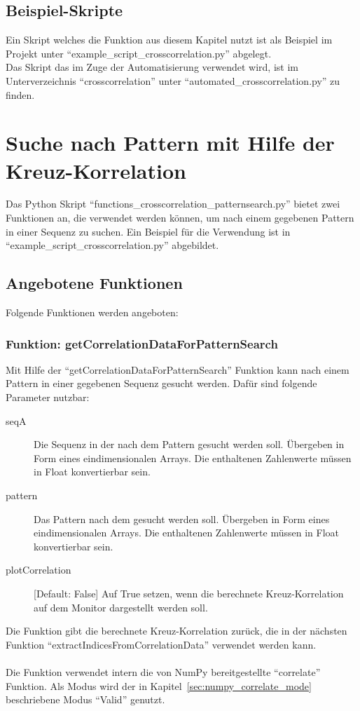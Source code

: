 \section{Beispiel-Skripte}
Ein Skript welches die Funktion aus diesem Kapitel nutzt ist als Beispiel im Projekt unter \enquote{example\_script\_crosscorrelation.py} abgelegt.\\
Das Skript das im Zuge der Automatisierung verwendet wird, ist im Unterverzeichnis \enquote{crosscorrelation} unter \enquote{automated\_crosscorrelation.py} zu finden.









\chapter{Suche nach Pattern mit Hilfe der Kreuz-Korrelation}
\label{chp:crosscorrelation:patternsearch}
Das Python Skript \enquote{functions\_crosscorrelation\_patternsearch.py} bietet zwei Funktionen an, die verwendet werden können, 
um nach einem gegebenen Pattern in einer Sequenz zu suchen.
Ein Beispiel für die Verwendung ist in \enquote{example\_script\_crosscorrelation.py} abgebildet.

\section{Angebotene Funktionen}
Folgende Funktionen werden angeboten:

\subsection{Funktion: getCorrelationDataForPatternSearch}
Mit Hilfe der \enquote{getCorrelationDataForPatternSearch} Funktion kann nach einem Pattern in einer gegebenen Sequenz gesucht werden. Dafür sind folgende Parameter nutzbar:
\begin{description}
    \item[seqA] Die Sequenz in der nach dem Pattern gesucht werden soll. Übergeben in Form eines eindimensionalen Arrays. Die enthaltenen Zahlenwerte müssen in Float konvertierbar sein.
    \item[pattern] Das Pattern nach dem gesucht werden soll. Übergeben in Form eines eindimensionalen Arrays. Die enthaltenen Zahlenwerte müssen in Float konvertierbar sein.
    \item[plotCorrelation] [Default: False] Auf True setzen, wenn die berechnete Kreuz-Korrelation auf dem Monitor dargestellt werden soll.
\end{description}
Die Funktion gibt die berechnete Kreuz-Korrelation zurück, die in der nächsten Funktion \enquote{extractIndicesFromCorrelationData} verwendet werden kann.
\\
\\
Die Funktion verwendet intern die von NumPy bereitgestellte \enquote{correlate} Funktion. Als Modus wird der in Kapitel~\ref{sec:numpy_correlate_mode} beschriebene Modus \enquote{Valid} genutzt.

